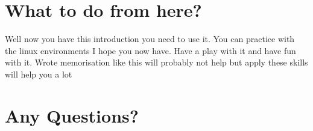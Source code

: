 \documentclass[a4paper]{article}
\begin{document}
\section*{What to do from here?}
\label{sec:org0a0b3a8}
\begin{notes}
	Well now you have this introduction you need to use it.
	You can practice with the linux environments I hope you now have. Have a play
	with it and have fun with it. Wrote memorisation like this will probably not
	help but apply these skills will help you a lot
\end{notes}

\section*{Any Questions?}
\label{sec:orgedcfefc}
\end{document}
